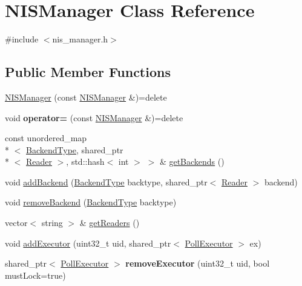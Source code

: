 \hypertarget{classNISManager}{\section{N\-I\-S\-Manager Class Reference}
\label{classNISManager}
}


{\ttfamily \#include $<$nis\-\_\-manager.\-h$>$}

\subsection*{Public Member Functions}
\begin{DoxyCompactItemize}
\item 
\hyperlink{classNISManager_a5694196f1df5f18ab9a2c8061075175e}{N\-I\-S\-Manager} (const \hyperlink{classNISManager}{N\-I\-S\-Manager} \&)=delete
\item 
\hypertarget{classNISManager_af191b49bf25bbf9bfd2cb5bd9cd9c434}{void {\bfseries operator=} (const \hyperlink{classNISManager}{N\-I\-S\-Manager} \&)=delete}\label{classNISManager_af191b49bf25bbf9bfd2cb5bd9cd9c434}

\item 
const unordered\-\_\-map\\*
$<$ \hyperlink{nis__types_8h_acee299fbb7d897867808250049524594}{Backend\-Type}, shared\-\_\-ptr\\*
$<$ \hyperlink{classnis_1_1interface_1_1Reader}{Reader} $>$, std\-::hash$<$ int $>$ $>$ \& \hyperlink{classNISManager_a6cad1a44e5ca799fc820c40fecd5cbf2}{get\-Backends} ()
\item 
void \hyperlink{classNISManager_a16f0f685a40a858762febd50f158b0ab}{add\-Backend} (\hyperlink{nis__types_8h_acee299fbb7d897867808250049524594}{Backend\-Type} backtype, shared\-\_\-ptr$<$ \hyperlink{classnis_1_1interface_1_1Reader}{Reader} $>$ backend)
\item 
void \hyperlink{classNISManager_ae1ff32a0e450569a8091fb5373874d7e}{remove\-Backend} (\hyperlink{nis__types_8h_acee299fbb7d897867808250049524594}{Backend\-Type} backtype)
\item 
vector$<$ string $>$ \& \hyperlink{classNISManager_a27a3db14eb804948d4031f115d3f6234}{get\-Readers} ()
\item 
void \hyperlink{classNISManager_a40aeca3b6e971ecb75495e2eae06c967}{add\-Executor} (uint32\-\_\-t uid, shared\-\_\-ptr$<$ \hyperlink{structPollExecutor}{Poll\-Executor} $>$ ex)
\item 
\hypertarget{classNISManager_a5d3721ef41e981161364b5c33eeccfc6}{shared\-\_\-ptr$<$ \hyperlink{structPollExecutor}{Poll\-Executor} $>$ {\bfseries remove\-Executor} (uint32\-\_\-t uid, bool must\-Lock=true)}\label{classNISManager_a5d3721ef41e981161364b5c33eeccfc6}


\end{DoxyCompactItemize}
